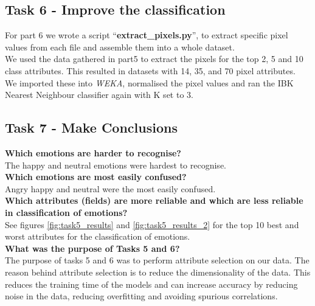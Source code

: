 \documentclass[12pt]{article}
\begin{document}
\subsection{Task 6 - Improve the classification}

For part 6 we wrote a script ``\textbf{extract\_pixels.py}'', to extract specific pixel values from each file and assemble them into a whole dataset.\\ 

We used the data gathered in part5 to extract the pixels for the top 2, 5 and 10 class attributes. This resulted in datasets with 14, 35, and 70 pixel attributes.\\

We imported these into \textit{WEKA}, normalised the pixel values and ran the IBK Nearest Neighbour classifier again with K set to 3.\\ 

\subsection{Task 7 - Make Conclusions}

\vspace{4mm}

\textbf{Which emotions are harder to recognise?}\\

The happy and neutral emotions were hardest to recognise.\\

\noindent\textbf{Which emotions are most easily confused?}\\

Angry happy and neutral were the most easily confused.\\

\noindent\textbf{Which attributes (fields) are more reliable and which are less reliable in classification of emotions?}\\

See figures \ref{fig:task5_results} and \ref{fig:task5_results_2} for the top 10 best and worst attributes for the classification of emotions.\\

\noindent\textbf{What was the purpose of Tasks 5 and 6?}\\

The purpose of tasks 5 and 6 was to perform attribute selection on our data. The reason behind attribute selection is to reduce the dimensionality of the data. This reduces the training time of the models and can increase accuracy by reducing noise in the data, reducing overfitting and avoiding spurious correlations.\cite{sain2010}\\
\end{document}
